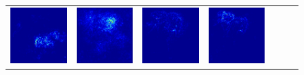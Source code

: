\begin{figure}
\begin{center}
\begin{tabular}{ccccccc}
\includegraphics[width=0.14\linewidth,height=0.115\linewidth]{figs/examples/googlenet/soft/zeb-ele2_sali_341} &
\includegraphics[width=0.14\linewidth,height=0.115\linewidth]{figs/examples/alexnet/soft/zeb-ele2_sali_387} &
\includegraphics[width=0.14\linewidth,height=0.115\linewidth]{figs/examples/vggnet/soft/zeb-ele2_sali_387} &
\includegraphics[width=0.14\linewidth,height=0.115\linewidth]{figs/examples/googlenet/soft/zeb-ele2_sali_387} \\

\end{tabular}
\end{center}
\end{figure}
